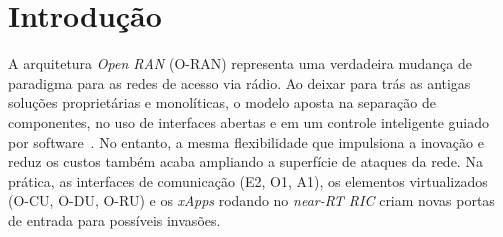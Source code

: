 \documentclass[12pt]{article}
\begin{document}

\section{Introdução}
\label{sec:intro}


A arquitetura \textit{Open RAN} (O-RAN) representa uma verdadeira mudança de paradigma para as redes de acesso via rádio. Ao deixar para trás as antigas soluções proprietárias e monolíticas, o modelo aposta na separação de componentes, no uso de interfaces abertas e em um controle inteligente guiado por software~\cite{oran2021}. No entanto, a mesma flexibilidade que impulsiona a inovação e reduz os custos também acaba ampliando a superfície de ataques da rede. Na prática, as interfaces de comunicação (E2, O1, A1), os elementos virtualizados (O-CU, O-DU, O-RU) e os \textit{xApps} rodando no \textit{near-RT RIC} criam novas portas de entrada para possíveis invasões.
\end{document}
